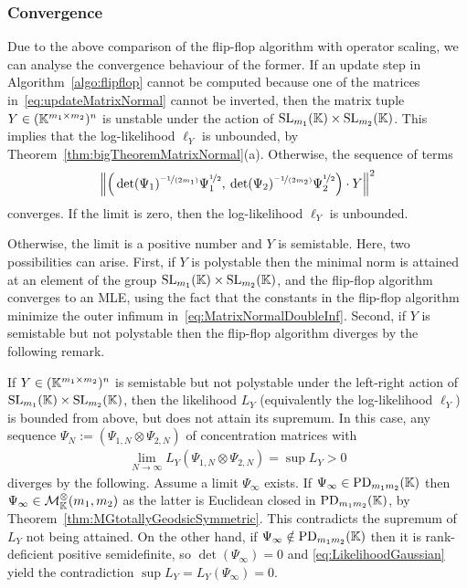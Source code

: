 \subsubsection*{Convergence}

Due to the above comparison of the flip-flop algorithm with operator scaling, we can analyse the convergence behaviour of the former.
If an update step in Algorithm~\ref{algo:flipflop} cannot be computed because one of the matrices in~\eqref{eq:updateMatrixNormal} cannot be inverted, then the matrix tuple $Y \in (\mathbb K^{m_1 \times m_2})^n$ is unstable under the action of $\operatorname{SL}_{m_1}(\mathbb K) \times \operatorname{SL}_{m_2}(\mathbb K)$. This implies that the log-likelihood $\ell_Y$ is unbounded, by Theorem~\ref{thm:bigTheoremMatrixNormal}(a).
Otherwise, the sequence of terms
	\[	\Big\| \Big( \det(\Psi_1)^{\nicefrac{-1}{(2m_1)}} \Psi_1^{\nicefrac{1}{2}}, \:
		\det(\Psi_2)^{\nicefrac{-1}{(2m_2)}} \Psi_2^{\nicefrac{1}{2}} \Big) \cdot Y \Big\|^2 \]
converges. If the limit is zero, then the log-likelihood $\ell_Y$ is unbounded.

Otherwise, the limit is a positive number and $Y$ is semistable. Here, two possibilities can arise.
First, if $Y$ is polystable then the minimal norm is attained at an element of the group $\operatorname{SL}_{m_1}(\mathbb K) \times \operatorname{SL}_{m_2}(\mathbb K)$, and the flip-flop algorithm converges to an MLE, using the fact that the constants in the flip-flop algorithm minimize the outer infimum in~\eqref{eq:MatrixNormalDoubleInf}.
Second, if $Y$ is semistable but not polystable then the flip-flop algorithm diverges by the following remark.

\begin{remark} \label{rem:noExtendedMLE}
	If $Y \in (\mathbb K^{m_1 \times m_2})^n$ is semistable but not polystable under the left-right action of $\operatorname{SL}_{m_1}(\mathbb K) \times \operatorname{SL}_{m_2}(\mathbb K)$, then the likelihood $L_Y$ (equivalently the log-likelihood $\ell_Y$) is bounded from above, but does not attain its supremum. In this case, any sequence $\Psi_N := (\Psi_{1,N} \otimes \Psi_{2,N})$ of concentration matrices with
	\begin{align*}
		\lim_{N \to \infty} L_Y(\Psi_{1,N} \otimes \Psi_{2,N}) = \sup L_Y > 0
	\end{align*}
	diverges by the following. Assume a limit $\Psi_{\infty}$ exists. If $\Psi_{\infty} \in \operatorname{PD}_{m_1 m_2}(\mathbb K)$ then $\Psi_{\infty} \in \mathcal{M}^{\otimes}_{\mathbb{K}}(m_1,m_2)$ as the latter is Euclidean closed in $\operatorname{PD}_{m_1 m_2}(\mathbb K)$, by Theorem~\ref{thm:MGtotallyGeodsicSymmetric}. This contradicts the supremum of $L_Y$ not being attained. On the other hand, if $\Psi_{\infty} \notin \operatorname{PD}_{m_1 m_2}(\mathbb K)$ then it is rank-deficient positive semidefinite, so $\det(\Psi_\infty)=0$ and \eqref{eq:LikelihoodGaussian} yield the contradiction $\sup L_Y = L_Y(\Psi_{\infty}) = 0$.
	\hfill\remSymbol
\end{remark}


